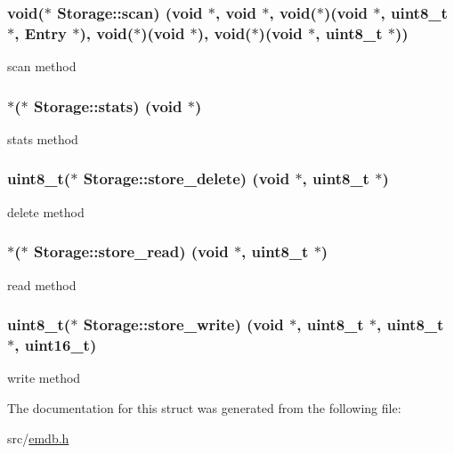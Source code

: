 \subsubsection[{scan}]{\setlength{\rightskip}{0pt plus 5cm}void($\ast$ Storage\+::scan) (void $\ast$, void $\ast$, void($\ast$)(void $\ast$, uint8\+\_\+t $\ast$, {\bf Entry} $\ast$), void($\ast$)(void $\ast$), void($\ast$)(void $\ast$, uint8\+\_\+t $\ast$))}\label{struct_storage_a5e24b45fef757acae34cca3bb8464935}
scan method \hypertarget{struct_storage_a6642751e068c1e64f8b65703a8bc51a0}{}
\subsubsection[{stats}]{$\ast$($\ast$ Storage\+::stats) (void $\ast$)}\label{struct_storage_a6642751e068c1e64f8b65703a8bc51a0}
stats method \hypertarget{struct_storage_ac3c5c981f9f3fc423a63f00af6172642}{}
\subsubsection[{store\+\_\+delete}]{\setlength{\rightskip}{0pt plus 5cm}uint8\+\_\+t($\ast$ Storage\+::store\+\_\+delete) (void $\ast$, uint8\+\_\+t $\ast$)}\label{struct_storage_ac3c5c981f9f3fc423a63f00af6172642}
delete method \hypertarget{struct_storage_a6a57b49c99b8f97439941c2705aa9280}{}
\subsubsection[{store\+\_\+read}]{$\ast$($\ast$ Storage\+::store\+\_\+read) (void $\ast$, uint8\+\_\+t $\ast$)}\label{struct_storage_a6a57b49c99b8f97439941c2705aa9280}
read method \hypertarget{struct_storage_a97c4534c1944aa12f98e645427fe1cc0}{}
\subsubsection[{store\+\_\+write}]{\setlength{\rightskip}{0pt plus 5cm}uint8\+\_\+t($\ast$ Storage\+::store\+\_\+write) (void $\ast$, uint8\+\_\+t $\ast$, uint8\+\_\+t $\ast$, uint16\+\_\+t)}\label{struct_storage_a97c4534c1944aa12f98e645427fe1cc0}
write method 

The documentation for this struct was generated from the following file\+:\begin{DoxyCompactItemize}
\item 
src/\hyperlink{emdb_8h}{emdb.\+h}\end{DoxyCompactItemize}
